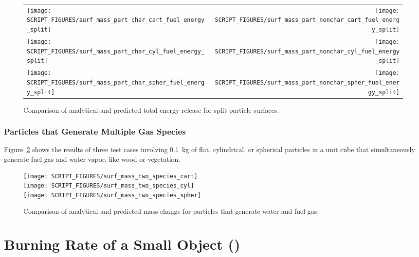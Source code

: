 \documentclass[11pt]{book}
\begin{document}
\begin{figure}[p]
\begin{tabular*}{\textwidth}{l@{\extracolsep{\fill}}r}
\texttt{[image: SCRIPT\_FIGURES/surf\_mass\_part\_char\_cart\_fuel\_energy\_split]} &
\texttt{[image: SCRIPT\_FIGURES/surf\_mass\_part\_nonchar\_cart\_fuel\_energy\_split]} \\
\texttt{[image: SCRIPT\_FIGURES/surf\_mass\_part\_char\_cyl\_fuel\_energy\_split]} &
\texttt{[image: SCRIPT\_FIGURES/surf\_mass\_part\_nonchar\_cyl\_fuel\_energy\_split]} \\
\texttt{[image: SCRIPT\_FIGURES/surf\_mass\_part\_char\_spher\_fuel\_energy\_split]} &
\texttt{[image: SCRIPT\_FIGURES/surf\_mass\_part\_nonchar\_spher\_fuel\_energy\_split]}
\end{tabular*}
\caption[The  test cases, energy conservation]{Comparison of analytical and predicted total energy release for split particle surfaces.}
\label{surf_mass_part_fuel_energy_split}
\end{figure}

\clearpage

\subsubsection{Particles that Generate Multiple Gas Species}
\label{surf_mass_two_species_cart}
\label{surf_mass_two_species_cyl}
\label{surf_mass_two_species_spher}

Figure~\ref{surf_mass_two_species} shows the results of three test cases involving 0.1~kg of flat, cylindrical, or spherical particles in a unit cube that simultaneously generate fuel gas and water vapor, like wood or vegetation.

\begin{figure}[!htb]
\centering
\texttt{[image: SCRIPT\_FIGURES/surf\_mass\_two\_species\_cart]} \\
\texttt{[image: SCRIPT\_FIGURES/surf\_mass\_two\_species\_cyl]} \\
\texttt{[image: SCRIPT\_FIGURES/surf\_mass\_two\_species\_spher]}
\caption[The  test cases]{Comparison of analytical and predicted mass change for particles that generate water and fuel gas.}
\label{surf_mass_two_species}
\end{figure}

\clearpage




\section{Burning Rate of a Small Object (\texorpdfstring{}{cell\_burn\_away})}
\label{cell_burn_away}
\end{document}
